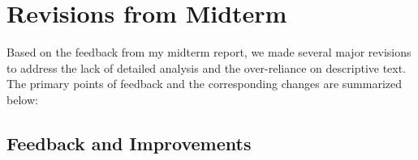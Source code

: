 \documentclass[12pt]{article}
\begin{document}
\section{Revisions from Midterm}
\label{sec:revisions-midterm}
Based on the feedback from my midterm report, we made several major revisions to address the lack of detailed analysis and the over-reliance on descriptive text. The primary points of feedback and the corresponding changes are summarized below:

\subsection{Feedback and Improvements}
\end{document}
